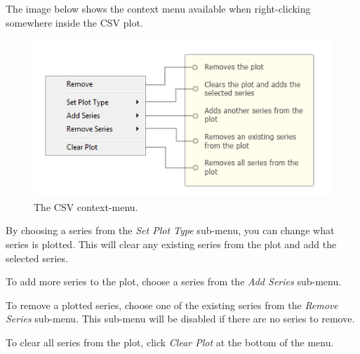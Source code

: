 The image below shows the context menu available when right-clicking
somewhere inside the CSV plot.

\begin{figure}[htbp]
\centering
\includegraphics[width=\textwidth]{figures/ICE_Viz_CSV-ContextMenu.png}
\caption{The CSV context-menu. }
\end{figure}

By choosing a series from the \emph{Set Plot Type} sub-menu, you can
change what series is plotted. This will clear any existing series from
the plot and add the selected series.

To add more series to the plot, choose a series from the \emph{Add
Series} sub-menu.

To remove a plotted series, choose one of the existing series from the
\emph{Remove Series} sub-menu. This sub-menu will be disabled if there
are no series to remove.

To clear all series from the plot, click \emph{Clear Plot} at the bottom
of the menu.
